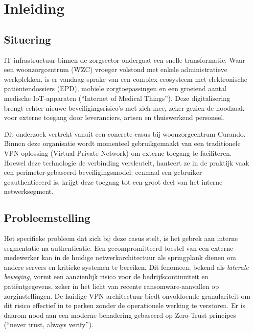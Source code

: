


% 


\section{Inleiding}%
\label{sec:inleiding}

\subsection{Situering}
IT-infrastructuur binnen de zorgsector ondergaat een snelle transformatie. Waar een woonzorgcentrum (WZC) vroeger volstond met enkele administratieve werkplekken, is er vandaag sprake van een complex ecosysteem met elektronische patiëntendossiers (EPD), mobiele zorgtoepassingen en een groeiend aantal medische IoT-apparaten (``Internet of Medical Things''). Deze digitalisering brengt echter nieuwe beveiligingsrisico's met zich mee, zeker gezien de noodzaak voor externe toegang door leveranciers, artsen en thuiswerkend personeel.

Dit onderzoek vertrekt vanuit een concrete casus bij woonzorgcentrum Curando. Binnen deze organisatie wordt momenteel gebruikgemaakt van een traditionele VPN-oplossing (Virtual Private Network) om externe toegang te faciliteren. Hoewel deze technologie de verbinding versleutelt, hanteert ze in de praktijk vaak een perimeter-gebaseerd beveiligingsmodel: eenmaal een gebruiker geauthenticeerd is, krijgt deze toegang tot een groot deel van het interne netwerksegment.

\subsection{Probleemstelling}
Het specifieke probleem dat zich bij deze casus stelt, is het gebrek aan interne segmentatie na authenticatie. Een gecompromitteerd toestel van een externe medewerker kan in de huidige netwerkarchitectuur als springplank dienen om andere servers en kritieke systemen te bereiken. Dit fenomeen, bekend als \emph{laterale beweging}, vormt een aanzienlijk risico voor de bedrijfscontinuïteit en patiëntgegevens, zeker in het licht van recente ransomware-aanvallen op zorginstellingen. De huidige VPN-architectuur biedt onvoldoende granulariteit om dit risico effectief in te perken zonder de operationele werking te verstoren. Er is daarom nood aan een moderne benadering gebaseerd op Zero-Trust principes (``never trust, always verify'').

